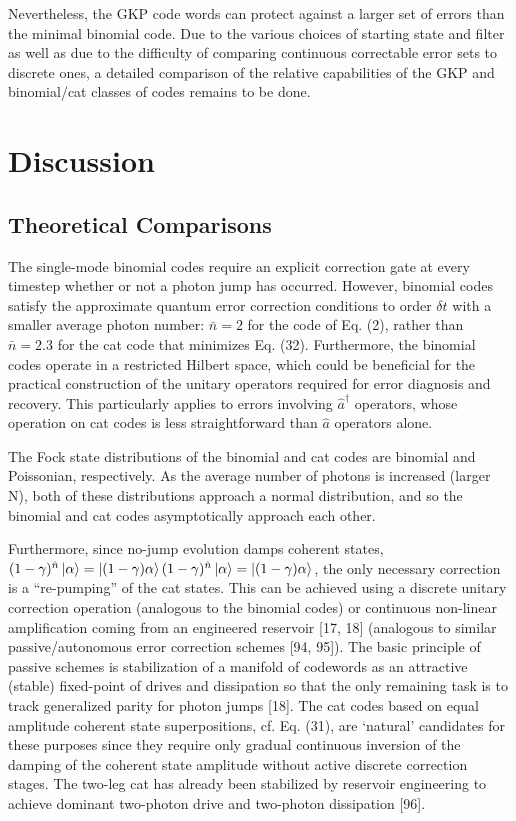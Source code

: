 \documentclass[12]{amsart}
\newcommand\0{\mathbf{0}}
\newcommand\<{\langle}
\renewcommand\>{\rangle}
\begin{document}
Nevertheless, the GKP code words can protect against a larger set of errors than the minimal binomial code. Due to the various choices of starting state and filter as well as due to the difficulty of comparing continuous correctable error sets to discrete ones, a detailed comparison of the relative capabilities of the GKP and binomial/cat classes of codes remains to be done.

\section{Discussion}

\subsection{Theoretical Comparisons}

The single-mode binomial codes require an explicit correction gate at every timestep whether or not a photon jump has occurred. However, binomial codes satisfy the approximate quantum error correction conditions to order $\delta t$ with a smaller average photon number: $\bar{n} = 2$ for the code of Eq. (2), rather than $\bar{n} = 2.3$ for the cat code that minimizes Eq. (32). Furthermore, the binomial codes operate in a restricted Hilbert space, which could be beneficial for the practical construction of the unitary operators required for error diagnosis and recovery. This particularly applies to errors involving $\hat{a}^\dag$ operators, whose operation on cat codes is less straightforward than $\hat{a}$ operators alone.

The Fock state distributions of the binomial and cat codes are binomial and Poissonian, respectively. As the average number of photons is increased (larger N), both of these distributions approach a normal distribution, and so the binomial and cat codes asymptotically approach each other. 

Furthermore, since no-jump evolution damps coherent states, $(1 - \gamma)^{\hat{n}}\ket{\alpha} = \ket{(1 - \gamma) \alpha}(1 - \gamma)^{\hat{n}}\ket{\alpha} = \ket{(1 - \gamma) \alpha}$, the only necessary correction is a “re-pumping” of the cat states. This can be achieved using a discrete unitary correction operation (analogous to the binomial codes) or continuous non-linear amplification coming from an engineered reservoir [17, 18] (analogous to similar passive/autonomous error correction schemes [94, 95]). The basic principle of passive schemes is stabilization of a manifold of codewords as an attractive (stable) fixed-point of drives and dissipation so that the only remaining task is to track generalized parity for photon jumps [18]. The cat codes based on equal amplitude coherent state superpositions, cf. Eq. (31), are ‘natural’ candidates for these purposes since they require only gradual continuous inversion of the damping of the coherent state amplitude without active discrete correction stages. The two-leg cat has already been stabilized by reservoir engineering to achieve dominant two-photon drive and two-photon dissipation [96].
\end{document}
